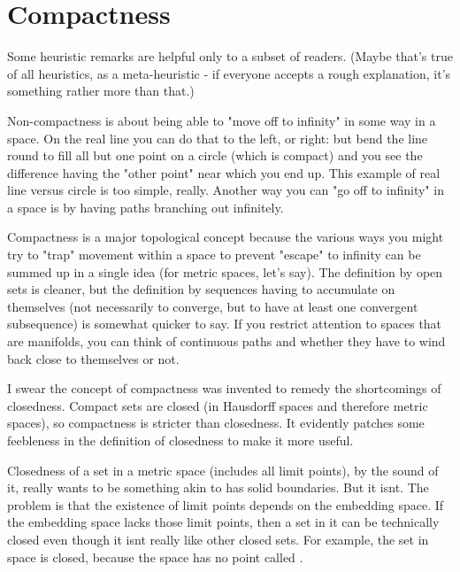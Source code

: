 \documentclass{tufte-book}
\theoremstyle{definition}
\numberwithin{section}{chapter}
\begin{document}
\section{Compactness}

Some heuristic remarks are helpful only to a subset of readers. (Maybe that's true of all heuristics, as a meta-heuristic - if everyone accepts a rough explanation, it's something rather more than that.)

Non-compactness is about being able to "move off to infinity" in some way in a space. On the real line you can do that to the left, or right: but bend the line round to fill all but one point on a circle (which is compact) and you see the difference having the "other point" near which you end up. This example of real line versus circle is too simple, really. Another way you can "go off to infinity" in a space is by having paths branching out infinitely.

Compactness is a major topological concept because the various ways you might try to "trap" movement within a space to prevent "escape" to infinity can be summed up in a single idea (for metric spaces, let's say). The definition by open sets is cleaner, but the definition by sequences having to accumulate on themselves (not necessarily to converge, but to have at least one convergent subsequence) is somewhat quicker to say. If you restrict attention to spaces that are manifolds, you can think of continuous paths and whether they have to wind back close to themselves or not.

I swear the concept of compactness was invented to remedy the shortcomings of closedness. Compact sets are closed (in Hausdorff spaces and therefore metric spaces), so compactness is stricter than closedness. It evidently patches some feebleness in the definition of closedness to make it more useful.

Closedness of a set in a metric space (includes all limit points), by the sound of it, really wants to be something akin to has solid boundaries. But it isnt. The problem is that the existence of limit points depends on the embedding space. If the embedding space lacks those limit points, then a set in it can be technically closed even though it isnt really like other closed sets. For example, the set  in space  is closed, because the space has no point called .

\end{document}
